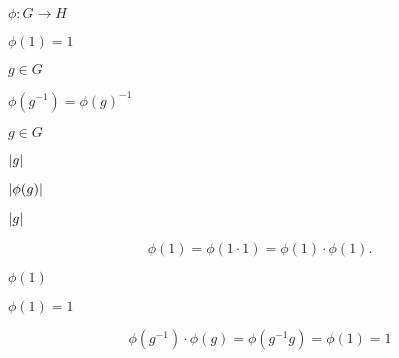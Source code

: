 \documentclass[10pt]{book}
\begin{document}
\begin{mdSnippets}
\begin{mdInlineSnippet}[245e4b87fe399dd2eb568a0c5e6f914b]%
$\phi: G \to H$\end{mdInlineSnippet}%
\begin{mdInlineSnippet}[e49793fa0ed5b6d7b2c931aba143383f]%
$\phi(1) = 1$\end{mdInlineSnippet}%
\begin{mdInlineSnippet}[c9742018c5575f06f59ce542b29ad79d]%
$g \in G$\end{mdInlineSnippet}%
\begin{mdInlineSnippet}[a024ad36a067f9f0fb662866cbf86b0f]%
$\phi(g^{-1}) = \phi(g)^{-1}$\end{mdInlineSnippet}%
\begin{mdInlineSnippet}[c9742018c5575f06f59ce542b29ad79d]%
$g \in G$\end{mdInlineSnippet}%
\begin{mdInlineSnippet}[15866c724739987a8b7cc06e8ce0f7fa]%
$\left\vert g\right\vert$\end{mdInlineSnippet}%
\begin{mdInlineSnippet}[aec71ef8e1f2517f035f0b7f20ba2a6d]%
$\left\vert \phi(g)\right\vert$\end{mdInlineSnippet}%
\begin{mdInlineSnippet}[15866c724739987a8b7cc06e8ce0f7fa]%
$\left\vert g\right\vert$\end{mdInlineSnippet}%
\begin{mdDisplaySnippet}[698248359121cd9d574d972d8fc0a3e4]%
\[%
\phi(1) = \phi(1 \cdot 1) = \phi(1) \cdot \phi(1).
\]%
\end{mdDisplaySnippet}%
\begin{mdInlineSnippet}%
$\phi(1)$\end{mdInlineSnippet}%
\begin{mdInlineSnippet}[e49793fa0ed5b6d7b2c931aba143383f]%
$\phi(1) = 1$\end{mdInlineSnippet}%
\begin{mdDisplaySnippet}%
\[%
\phi(g^{-1}) \cdot \phi(g) = \phi(g^{-1} g) = \phi(1) = 1
\]%
\end{mdDisplaySnippet}%
\begin{mdInlineSnippet}[91e143622b5d3124cbcef49cb3de0173]%

\end{mdInlineSnippet}
\end{mdSnippets}
\end{document}
